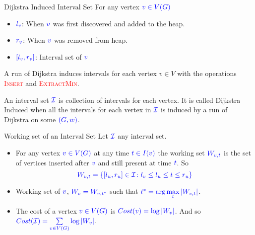 \documentclass[10pt, handout]{beamer}
\begin{document}
\begin{frame}{Dijkstra Induced Interval Set}
	For any vertex $\mathcolor{blue}{v\in V(G)}$\begin{itemize}
		\item $\mathcolor{blue}{l_v}$: When $\mathcolor{blue}{v}$ was first discovered and added to the heap.
		\item $\mathcolor{blue}{r_v}$: When $\mathcolor{blue}{v}$ was removed from heap.
		\item $\mathcolor{blue}{[l_v,r_v]}$: Interval set of $\mathcolor{blue}{v}$
	\end{itemize} \pause \vfill

	A run of Dijkstra induces intervals for each vertex $v\in V$ with the operations \textcolor{red}{\textsc{Insert}} and \textcolor{red}{\textsc{ExtractMin}}.\pause  \vfill

	An interval set $\mathcolor{blue}{\mathcal{I}}$ is collection of intervals for each vertex. It is called Dijkstra Induced when all the intervals for each vertex in $\mathcolor{blue}{\mathcal{I}}$ is induced by a run of Dijkstra on some $\mathcolor{blue}{(G,w)}$.
\end{frame}
\begin{frame}{Working set of an Interval Set}
	Let $\mathcolor{blue}{\mathcal{I}}$ any interval set.\pause

	\begin{itemize}
		\item For any vertex $\mathcolor{blue}{v\in V(G)}$ at any time $\mathcolor{blue}{t\in I(v)}$ the working set $\mathcolor{blue}{W_{v,t}}$ is the set of vertices inserted after $\mathcolor{blue}{v}$ and still present at time $\mathcolor{blue}{t}$. So $$\mathcolor{blue}{W_{v,t}=\{[l_u,r_u]\in\mathcal{I}\colon l_v\leq l_u\leq t\leq r_u\}}$$\pause \vfill
		\item Working set of $\mathcolor{blue}{v}$, $\mathcolor{blue}{W_v=W_{v,t^*}}$ such that $\mathcolor{blue}{t^*=\arg\max\limits_t|W_{v,t}|}$.\pause  \vfill
		\item The cost of a vertex $\mathcolor{blue}{v\in V(G)}$ is $\mathcolor{blue}{Cost(v)=\log|W_v|}$. And so $\mathcolor{blue}{Cost(\mathcal{I})=\sum\limits_{v\in V(G)} \log |W_v|}$.
	\end{itemize}
\end{frame}
\end{document}
